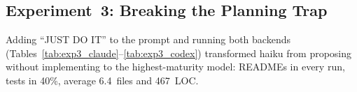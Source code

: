 \documentclass{article}
\begin{document}
\subsection{Experiment~3: Breaking the Planning Trap}

Adding ``JUST DO IT'' to the prompt and running both backends
(Tables~\ref{tab:exp3_claude}--\ref{tab:exp3_codex}) transformed
haiku from proposing without implementing to the
highest-maturity model: READMEs in every run, tests in 40\%,
average 6.4~files and 467~LOC.

\begin{table}[t]
\caption{Experiment~3: Claude backend, Anthropic models.}
\label{tab:exp3_claude}
\small{}
\end{table}

\begin{table}[t]
\caption{Experiment~3: Claude backend, GPT models via litellm.}
\label{tab:exp3_gpt_claude}
\small{}
\end{table}
\end{document}
